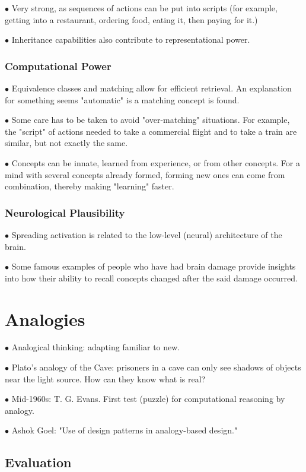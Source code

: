 \documentclass[english,openany]{book}
\begin{document}
$\bullet$ Very strong, as sequences of actions can be put into scripts (for example, getting into a restaurant, ordering food, eating it, then paying for it.)

$\bullet$ Inheritance capabilities also contribute to representational power.

\subsection{Computational Power}

$\bullet$ Equivalence classes and matching allow for efficient retrieval. An explanation for something seems "automatic" is a matching concept is found.

$\bullet$ Some care has to be taken to avoid "over-matching" situations. For example, the "script" of actions needed to take a commercial flight and to take a train are similar, but not exactly the same.

$\bullet$ Concepts can be innate, learned from experience, or from other concepts. For a mind with several concepts already formed, forming new ones can come from combination, thereby making "learning" faster.

\subsection{Neurological Plausibility}

$\bullet$ Spreading activation is related to the low-level (neural) architecture of the brain.

$\bullet$ Some famous examples of people who have had brain damage provide insights into how their ability to recall concepts changed after the said damage occurred.

\chapter{Analogies}

$\bullet$ Analogical thinking: adapting familiar to new.

$\bullet$ Plato's analogy of the Cave: prisoners in a cave can only see shadows of objects near the light source. How can they know what is real?

$\bullet$ Mid-1960s: T. G. Evans. First test (puzzle) for computational reasoning by analogy.

$\bullet$ Ashok Goel: "Use of design patterns in analogy-based design."

\section{Evaluation}
\end{document}
